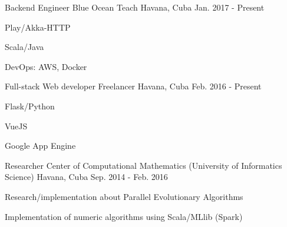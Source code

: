 


\begin{cventries}


\cventry
{Backend Engineer} %
{Blue Ocean Teach} %
{Havana, Cuba} %
{Jan. 2017 - Present} %
{ %
\begin{cvitems}
\item {Play/Akka-HTTP}
\item {Scala/Java}
\item {DevOps: AWS, Docker}
\end{cvitems}
}


\cventry
{Full-stack Web developer} %
{Freelancer} %
{Havana, Cuba} %
{Feb. 2016 - Present} %
{ %
\begin{cvitems}
\item {Flask/Python}
\item {VueJS}
\item {Google App Engine}
\end{cvitems}
}


\cventry
{Researcher} %
{Center of Computational Mathematics (University of Informatics Science)} %
{Havana, Cuba} %
{Sep. 2014 - Feb. 2016} %
{ %
\begin{cvitems}
\item {Research/implementation about Parallel Evolutionary Algorithms}
\item {Implementation of numeric algorithms using Scala/MLlib (Spark)}
\end{cvitems}
}



\end{cventries}
